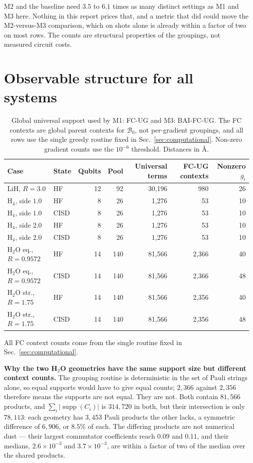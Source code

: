 \documentclass[10pt]{article}
\newcommand{\supp}{\operatorname{supp}}
\begin{document}
M2 and the baseline need $3.5$ to $6.1$ times as many distinct settings as M1 and M3 here. Nothing in this report prices that, and a metric that did could move the M2-versus-M3 comparison, which on shots alone is already within a factor of two on most rows. The counts are structural properties of the groupings, not measured circuit costs.

\section{Observable structure for all systems}
\label{sec:structure}

\begin{table}[!htbp]
\centering
\scriptsize
\caption{Global universal support used by M1: FC-UG and M3: BAI-FC-UG. The FC contexts are global parent contexts for $\mathcal B_0$, not per-gradient groupings, and all rows use the single greedy routine fixed in Sec.~\ref{sec:computational}. Non-zero gradient counts use the $10^{-6}$ threshold. Distances in \si{\angstrom}.}
\label{tab:structure}
\begin{tabular}{llrrrrr}
\toprule
Case & State & Qubits & Pool & Universal terms & FC-UG contexts & Nonzero $g_i$ \\
\midrule
LiH, $R{=}3.0$ & HF & 12 & 92 & 30,196 & 980 & 26 \\
H$_4$, side $1.0$ & HF & 8 & 26 & 1,276 & 53 & 10 \\
H$_4$, side $1.0$ & CISD & 8 & 26 & 1,276 & 53 & 10 \\
H$_4$, side $2.0$ & HF & 8 & 26 & 1,276 & 53 & 10 \\
H$_4$, side $2.0$ & CISD & 8 & 26 & 1,276 & 53 & 10 \\
H$_2$O eq., $R{=}0.9572$ & HF & 14 & 140 & 81,566 & 2,366 & 40 \\
H$_2$O eq., $R{=}0.9572$ & CISD & 14 & 140 & 81,566 & 2,366 & 48 \\
H$_2$O str., $R{=}1.75$ & HF & 14 & 140 & 81,566 & 2,356 & 40 \\
H$_2$O str., $R{=}1.75$ & CISD & 14 & 140 & 81,566 & 2,356 & 48 \\
\bottomrule
\end{tabular}
\end{table}

All FC context counts come from the single routine fixed in Sec.~\ref{sec:computational}.

\textbf{Why the two H$_2$O geometries have the same support size but different context counts.} The grouping routine is deterministic in the set of Pauli strings alone, so equal supports would have to give equal counts; $2{,}366$ against $2{,}356$ therefore means the supports are not equal. They are not. Both contain $81{,}566$ products, and $\sum_i|\supp(C_i)|$ is $314{,}720$ in both, but their intersection is only $78{,}113$: each geometry has $3{,}453$ Pauli products the other lacks, a symmetric difference of $6{,}906$, or $8.5\%$ of each. The differing products are not numerical dust --- their largest commutator coefficients reach $0.09$ and $0.11$, and their medians, $2.6\times10^{-3}$ and $3.7\times10^{-3}$, are within a factor of two of the median over the shared products.
\end{document}
